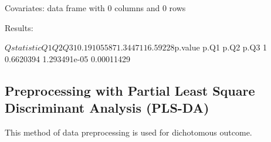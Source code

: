 \documentclass{article}
\begin{document}
\begin{Schunk}
\begin{Soutput}
Covariates:
data frame with 0 columns and 0 rows


Results:

$Qstatistic
         Q1       Q2       Q3
1 0.1910558 71.34471 16.59228

$p.value
       p.Q1         p.Q2       p.Q3
1 0.6620394 1.293491e-05 0.00011429
\end{Soutput}
\end{Schunk}

\subsection{Preprocessing with Partial Least Square Discriminant Analysis (PLS-DA)}

This method of data preprocessing is used for dichotomous outcome.
\end{document}
